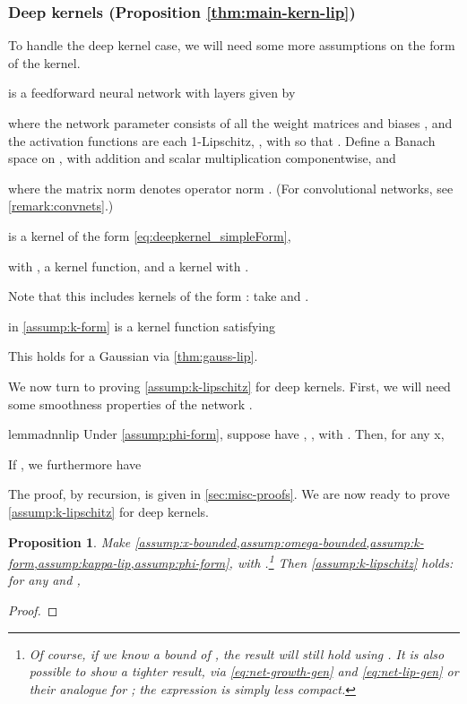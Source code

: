 \documentclass{article}
\newtheorem{prop}[theorem]{Proposition}  \crefname{prop}{Proposition}{Propositions}
\begin{document}
\subsubsection{Deep kernels (Proposition \ref{thm:main-kern-lip})} \label{sec:proof:deep-kernels}

To handle the deep kernel case, we will need some more assumptions on the form of the kernel.

\begin{netassumplist}[resume]
  \item \label{assump:phi-form}
    
    is a feedforward neural network with  layers given by
    
    where the network parameter 
    consists of all the weight matrices 
    and biases ,
    and the activation functions  are each 1-Lipschitz,
    ,
    with  so that .
    Define a Banach space on ,
    with addition and scalar multiplication componentwise,
    and
    
    where the matrix norm denotes operator norm
    .
    (For convolutional networks, see \cref{remark:convnets}.)

  \item \label{assump:k-form}
     is a kernel of the form \eqref{eq:deepkernel_simpleForm},
    
    with
    ,
     a kernel function,
    and  a kernel with .

    Note that this includes kernels of the form : take  and .

  \item \label{assump:kappa-lip}
     in \cref{assump:k-form} is a kernel function satisfying
    
    This holds for a Gaussian  via \cref{thm:gauss-lip}.
\end{netassumplist}

We now turn to proving \cref{assump:k-lipschitz} for deep kernels.
First, we will need some smoothness properties of the network .
\begin{restatable}{lemma}{dnnlip} \label{thm:dnn-lip}
    Under \cref{assump:phi-form},
    suppose  have
    , ,
    with .
    Then, for any x,
    
    If , we furthermore have
    
\end{restatable}
The proof, by recursion, is given in \cref{sec:misc-proofs}.
We are now ready to prove \cref{assump:k-lipschitz} for deep kernels.
\begin{prop} \label{thm:kern-lip}
    Make \cref{assump:x-bounded,assump:omega-bounded,assump:k-form,assump:kappa-lip,assump:phi-form},
    with .\footnote{Of course, if we know a bound of , the result will still hold using . It is also possible to show a tighter result, via \eqref{eq:net-growth-gen} and \eqref{eq:net-lip-gen} or their analogue for ; the expression is simply less compact.}
    Then \cref{assump:k-lipschitz} holds:
    for any 
    and ,
    
\end{prop}
\begin{proof}
    
\end{proof}
\end{document}
